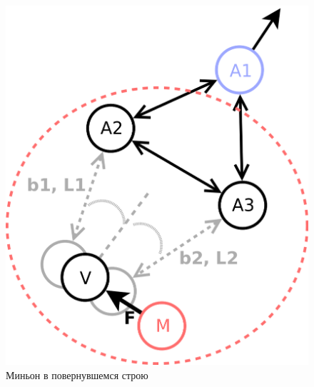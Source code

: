 \documentclass[10pt]{beamer}
\begin{document}
\begin{frame}
\begin{columns}
		\begin{figure}
			\centering
			\includegraphics[width=0.8\linewidth]{others/minions-alg-rotated}
			\caption{Миньон в повернувшемся строю}
			\label{fig:minions-alg-rotated}
		\end{figure}
	\end{columns}
\end{frame}
\end{document}
